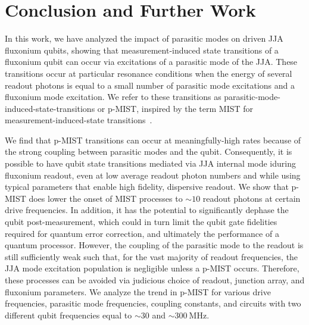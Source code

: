 \documentclass[%
reprint,
superscriptaddress,
 amsmath,amssymb,
 aps,
 prx,
longbibliography,
floatfix,
]{revtex4-2}
\begin{document}
\section{Conclusion and Further Work}\label{sec:conclusion}

In this work, we have analyzed the impact of parasitic modes on driven JJA fluxonium qubits, showing that measurement-induced state transitions of a fluxonium qubit can occur via excitations of a parasitic mode of the JJA. These transitions occur at particular resonance conditions when the energy of several readout photons is equal to a small number of parasitic mode excitations and a fluxonium mode excitation.  We refer to these transitions as parasitic-mode-induced-state-transitions or p-MIST, inspired by the term MIST for measurement-induced-state transitions~\cite{sank2016measurement}. 

We find that p-MIST transitions can occur at meaningfully-high rates because of the strong coupling between  parasitic modes and the qubit. Consequently, it is possible to have qubit state transitions mediated via JJA internal mode iduring fluxonium readout, even at low average readout photon numbers and while using typical parameters that enable high fidelity, dispersive readout. We show that p-MIST does lower the onset of MIST processes to $\sim 10$ readout photons at certain drive frequencies. In addition, it has the potential to significantly dephase the qubit post-measurement, which could in turn limit the qubit gate fidelities required for quantum error correction, and ultimately the performance of a quantum processor. However, the coupling of the parasitic mode to the readout is still sufficiently weak such that, for the vast majority of readout frequencies, the JJA mode excitation population is negligible unless a p-MIST occurs. Therefore, these processes can be avoided via judicious choice of readout, junction array, and fluxonium parameters.
We analyze the trend in p-MIST for various drive frequencies, parasitic mode frequencies, coupling constants, and circuits with two different qubit frequencies equal to $\sim 30$ and $\sim 300 \ \mathrm{MHz}$. 

\end{document}
